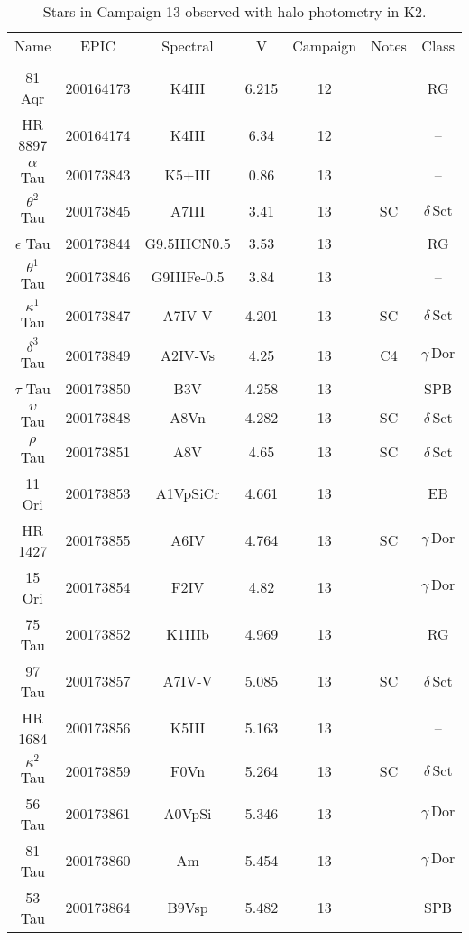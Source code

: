\begin{table*}
\caption{Stars in Campaign 13 observed with halo photometry in K2.\label{table_3}}
\begin{tabular}{ccccccc}
\hline \hline
Name & EPIC & Spectral & V & Campaign & Notes & Class \\
 &  &  &  &  &  &  \\
\hline
81 Aqr & 200164173 & K4III & 6.215 & 12 &  & RG \\
HR 8897 & 200164174 & K4III & 6.34 & 12 &  & -- \\
$\alpha$ Tau & 200173843 & K5+III & 0.86 & 13 & \tablenotemark{c} & -- \\
$\theta^{2}$ Tau & 200173845 & A7III & 3.41 & 13 & SC & $\delta\,\text{Sct}$ \\
$\epsilon$ Tau & 200173844 & G9.5IIICN0.5 & 3.53 & 13 & \tablenotemark{d} & RG \\
$\theta^{1}$ Tau & 200173846 & G9IIIFe-0.5 & 3.84 & 13 &  & -- \\
$\kappa^{1}$ Tau & 200173847 & A7IV-V & 4.201 & 13 & SC & $\delta\,\text{Sct}$ \\
$\delta^{3}$ Tau & 200173849 & A2IV-Vs & 4.25 & 13 & C4 & $\gamma\,\text{Dor}$ \\
$\tau$ Tau & 200173850 & B3V & 4.258 & 13 &  & SPB \\
$\upsilon$ Tau & 200173848 & A8Vn & 4.282 & 13 & SC & $\delta\,\text{Sct}$ \\
$\rho$ Tau & 200173851 & A8V & 4.65 & 13 & SC & $\delta\,\text{Sct}$ \\
11 Ori & 200173853 & A1VpSiCr & 4.661 & 13 &  & EB \\
HR 1427 & 200173855 & A6IV & 4.764 & 13 & SC & $\gamma\,\text{Dor}$ \\
15 Ori & 200173854 & F2IV & 4.82 & 13 &  & $\gamma\,\text{Dor}$ \\
75 Tau & 200173852 & K1IIIb & 4.969 & 13 &  & RG \\
97 Tau & 200173857 & A7IV-V & 5.085 & 13 & SC & $\delta\,\text{Sct}$ \\
HR 1684 & 200173856 & K5III & 5.163 & 13 &  & -- \\
$\kappa^{2}$ Tau & 200173859 & F0Vn & 5.264 & 13 & SC & $\delta\,\text{Sct}$ \\
56 Tau & 200173861 & A0VpSi & 5.346 & 13 &  & $\gamma\,\text{Dor}$ \\
81 Tau & 200173860 & Am & 5.454 & 13 &  & $\gamma\,\text{Dor}$ \\
53 Tau & 200173864 & B9Vsp & 5.482 & 13 &  & SPB \\

\end{tabular}
\end{table*}
